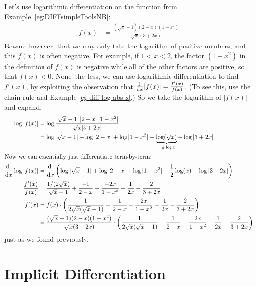 \begin{eg}
Let's use logarithmic differentiation on the function from
Example~\ref{eg:DIFFsimpleToolsNB}:
\begin{align*}
f(x) &=\frac{(\sqrt{x}-1)(2-x)(1-x^2)}{\sqrt{x}(3+2x)}
\end{align*}
Beware however, that we may only take the logarithm of positive numbers,
and this $f(x)$ is often negative. For example, if $1<x<2$, the factor
$(1-x^2)$ in the definition of $f(x)$ is negative while all of the other factors are positive, so that $f(x)<0$. None--the--less, we can use logarithmic
differentiation to find $f'(x)$,  by exploiting the observation that
$\diff{}{x}|f(x)|=\frac{f'(x)}{f(x)}$. (To see this, use the chain rule and
Example \ref{eg diff log abs x}.) So we take the logarithm of $|f(x)|$ and expand.
\begin{align*}
\log |f(x)| &= \log \frac{|\sqrt{x}-1|\,|2-x|\,|1-x^2|}{\sqrt{x}|3+2x|} \\
  &= \log|\sqrt{x}-1| + \log|2-x| + \log|1-x^2| -
\underbrace{\log(\sqrt{x})}_{=\frac{1}{2}\log x} - \log|3+2x| \\
\intertext{Now we can essentially just differentiate term-by-term:}
\diff{}{x}\log |f(x)| &= \diff{}{x} \left(
  \log|\sqrt{x}-1| + \log|2-x| + \log|1-x^2| - \frac{1}{2}\log(x) - \log|3+2x|
 \right)\\
\frac{f'(x)}{f(x)} &= \frac{1/(2\sqrt{x})}{\sqrt{x}-1}
  + \frac{-1}{2-x} + \frac{-2x}{1-x^2} - \frac{1}{2x} - \frac{2}{3+2x} \\
f'(x) &= f(x) \cdot \left( \frac{1}{2 \sqrt{x} (\sqrt{x}-1)}
  - \frac{1}{2-x} - \frac{2x}{1-x^2} - \frac{1}{2x} - \frac{2}{3+2x}
\right)\\
  &= \frac{(\sqrt{x}-1)(2-x)(1-x^2)}{\sqrt{x}(3+2x)}
  \cdot \left( \frac{1}{2 \sqrt{x} (\sqrt{x}-1)}
  - \frac{1}{2-x} - \frac{2x}{1-x^2} - \frac{1}{2x} - \frac{2}{3+2x}
\right)
\end{align*}
just as we found previously.
\end{eg}


\section{Implicit Differentiation}


